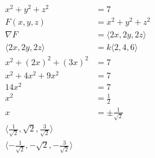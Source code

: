 \documentclass{article}
\begin{document}
\setcounter{subsubsection}{24}
\subsubsection{}

\begin{align*}
  x^2 + y^2 + z^2               & = 7                              \\
  F(x, y, z)                    & = x^2 + y^2 + z^2                \\
  \nabla F                      & = \langle 2 x, 2 y, 2 z \rangle  \\
  \langle 2 x, 2 y, 2 z \rangle & = k \langle 2, 4, 6 \rangle      \\
  x^2 + (2 x)^2 + (3 x)^2       & = 7                              \\
  x^2 + 4 x^2 + 9 x^2           & = 7                              \\
  14 x^2                        & = 7                              \\
  x^2                           & = \frac{1}{2}                    \\
  x                             & = \pm \frac{1}{\sqrt{2}}         \\
  \langle \frac{1}{\sqrt{2}}, \sqrt{2}, \frac{3}{\sqrt{2}} \rangle \\
  \langle -\frac{1}{\sqrt{2}}, -\sqrt{2}, -\frac{3}{\sqrt{2}} \rangle
\end{align*}

\setcounter{subsubsection}{26}
\subsubsection{}
\end{document}
